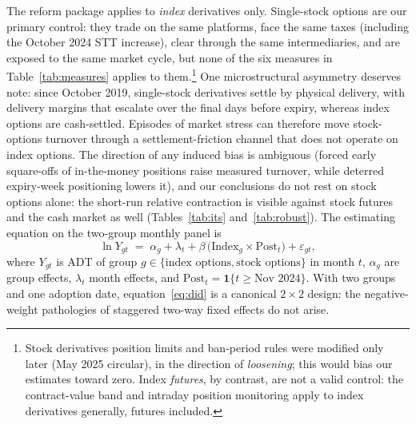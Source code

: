 \documentclass[12pt]{article}
\begin{document}
The reform package applies to \emph{index} derivatives only. Single-stock
options are our primary control: they trade on the same platforms, face the
same taxes (including the October 2024 STT increase), clear through the same
intermediaries, and are exposed to the same market cycle, but none of the
six measures in Table~\ref{tab:measures} applies to them.\footnote{Stock
derivatives position limits and ban-period rules were modified only later
(May 2025 circular), in the direction of \emph{loosening}; this would bias
our estimates toward zero. Index \emph{futures}, by contrast, are not a
valid control: the contract-value band and intraday position monitoring
apply to index derivatives generally, futures included.} One
microstructural asymmetry deserves note:
since October 2019, single-stock derivatives settle by physical delivery,
with delivery margins that escalate over the final days before expiry,
whereas index options are cash-settled. Episodes of market stress can
therefore move stock-options turnover through a settlement-friction channel
that does not operate on index options. The direction of any induced bias
is ambiguous (forced early square-offs of in-the-money positions raise
measured turnover, while deterred expiry-week positioning lowers it), and
our conclusions do not rest on stock options alone: the short-run relative
contraction is visible against stock futures and the cash market as well
(Tables~\ref{tab:its} and~\ref{tab:robust}). The estimating equation on the
two-group monthly panel is
\begin{equation}
\ln Y_{gt} \;=\; \alpha_g + \lambda_t + \beta\, \big(\mathrm{Index}_g \times
\mathrm{Post}_t\big) + \varepsilon_{gt},
\label{eq:did}
\end{equation}
where $Y_{gt}$ is ADT of group $g \in \{\text{index options},
\text{stock options}\}$ in month $t$, $\alpha_g$ are group effects,
$\lambda_t$ month effects, and $\mathrm{Post}_t = \mathbf{1}\{t \geq
\text{Nov 2024}\}$. With two groups and one adoption date,
equation~\eqref{eq:did} is a canonical $2\times2$ design: the negative-weight
pathologies of staggered two-way fixed effects
\citep{goodmanbacon2021,callawaysantanna2021,sunabraham2021} do not arise.
\end{document}
